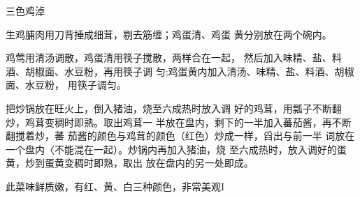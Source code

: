 \begin{recipe}{三色鸡淖}

\ingredients


\cooking

\step 	生鸡脯肉用刀背捶成细茸，剔去筋缠；鸡蛋清、鸡蛋 黄分别放在两个碗内。

\step 	鸡莺用清汤调散，鸡蛋清用筷子搅散，两样合在一起， 然后加入味精、盐、料酒、胡椒面、水豆粉，再用筷子调 匀;鸡蛋黄内加入清汤、味精、盐、料酒、胡椒面、水豆粉， 用筷子调匀。

\step 	把炒锅放在旺火上，倒入猪油，烧至六成热时放入调 好的鸡茸，用瓢子不断翻炒，鸡茸变稠时即熟。取出鸡茸一 半放在盘内，剩下的一半加入蕃茄酱，再不断翻搅着炒，蕃 茄酱的颜色与鸡茸的颜色（红色）炒成一样，舀出与前一半 词放在一个盘内〈不能混在一起）。炒锅内再加入猪油，烧 至六成热时，放入调好的蛋黄，炒到蛋黄变稠时即熟，取出 放在盘内的另一处即成。

\notes

此菜味鲜质嫩，有红、黄、白三种颜色，非常美观I

\end{recipe}


